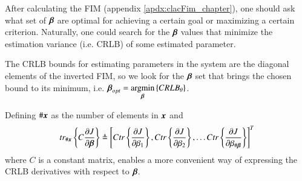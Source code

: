 \label{apdx:betaOpt}
After calculating the FIM (appendix \ref{apdx:clacFim_chapter}), one should ask what set of $\boldsymbol{\beta}$ are optimal for achieving a certain goal or maximizing a certain criterion. Naturally, one could search for the $\boldsymbol{\beta}$ values that minimize the estimation variance (i.e. CRLB) of some estimated parameter.
\par The CRLB bounds for estimating parameters in the system are the diagonal elements of the inverted FIM, so we look for the $\boldsymbol{\beta}$ set that brings the chosen bound to its minimum, i.e. 
$
\boldsymbol{\beta}_{opt} = 
\underset{\boldsymbol{\beta}}{\mathrm{argmin}} 
\left\{
CRLB_{\theta}
\right\}
$.
\par Defining $\#\boldsymbol{x}$ as the number of elements in $\boldsymbol{x}$ and $$
tr_{\#\boldsymbol{x}}
\left\{
C\frac{\partial{J}}{\partial{\boldsymbol{\beta}}}
\right\} 
\triangleq
\left[
Ctr\left\{\frac{\partial{J}}{\partial{\beta_{1}}}\right\},
Ctr\left\{\frac{\partial{J}}{\partial{\beta_{2}}}\right\},
\hdots
Ctr\left\{\frac{\partial{J}}{\partial{\beta_{\#\boldsymbol{\beta}}}}\right\}
\right]^{T} $$ where $C$ is a constant matrix, enables a more convenient way of expressing the CRLB derivatives with respect to $\boldsymbol{\beta}$.
\\  
\ifdefined\showDev
